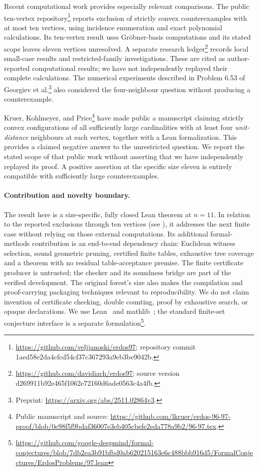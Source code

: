 \documentclass[11pt,a4paper]{article}
\theoremstyle{definition}
\begin{document}
Recent computational work provides especially relevant comparisons. The public ten-vertex repository\footnote{\raggedright \url{https://github.com/veljjanoski/erdos97}; repository commit 1aed58e2da4cfcd54cf37c367293a9eb3be9042b.} reports exclusion of strictly convex counterexamples with at most ten vertices, using incidence enumeration and exact polynomial calculations. Its ten-vertex result uses Gr\"obner-basis computations and its stated scope leaves eleven vertices unresolved. A separate research ledger\footnote{\raggedright \url{https://github.com/davidiach/erdos97}; source version d269911b92e465f1062e72160d6ade0563c4a4fb.} records local small-case results and restricted-family investigations. These are cited as author-reported computational results; we have not independently replayed their complete calculations. The numerical experiments described in Problem 6.53 of Georgiev et al.\footnote{\raggedright Preprint: \url{https://arxiv.org/abs/2511.02864v3}.} also considered the four-neighbour question without producing a counterexample.

Kruer, Kohlmeyer, and Price\footnote{\raggedright Public manuscript and source: \url{https://github.com/lkruer/erdos-96-97-proof/blob/0e98f5f9bdaf36007e3eb405cbefe2eda778a9b2/96-97.tex}.} have made public a manuscript claiming strictly convex configurations of all sufficiently large cardinalities with at least four \emph{unit-distance} neighbours at each vertex, together with a Lean formalization. This provides a claimed negative answer to the unrestricted question. We report the stated scope of that public work without asserting that we have independently replayed its proof. A positive assertion at the specific size eleven is entirely compatible with sufficiently large counterexamples.

\paragraph{Contribution and novelty boundary.}
The result here is a size-specific, fully closed Lean theorem at $n=11$. In relation to the reported exclusions through ten vertices (see ), it addresses the next finite case without relying on those external computations. Its additional formal-methods contribution is an end-to-end dependency chain: Euclidean witness selection, sound geometric pruning, certified finite tables, exhaustive tree coverage and a theorem with no residual table-acceptance premise. The finite certificate producer is untrusted; the checker and its soundness bridge are part of the verified development. The original forest's size also makes the compilation and proof-carrying packaging techniques relevant to reproducibility. We do not claim invention of certificate checking, double counting, proof by exhaustive search, or opaque declarations. We use Lean~\cite{Lean2021} and mathlib~\cite{Mathlib2020}; the standard finite-set conjecture interface is a separate formulation\footnote{\raggedright \url{https://github.com/google-deepmind/formal-conjectures/blob/7db2ea3b91bfbd0ab620215163e6c488bbb916d5/FormalConjectures/ErdosProblems/97.lean}}.
\end{document}
